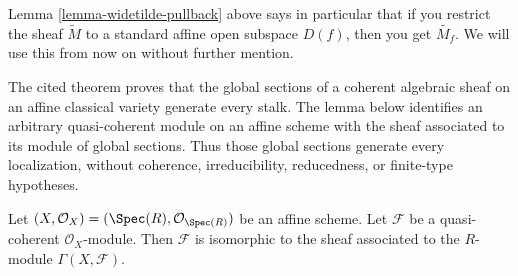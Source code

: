 \noindent
Lemma \ref{lemma-widetilde-pullback} above says in particular
that if you restrict
the sheaf $\widetilde M$ to a standard affine open subspace
$D(f)$, then you get $\widetilde{M_f}$. We will use this from
now on without further mention.

\begin{lemma}
\label{lemma-quasi-coherent-affine}
\begin{reference}
\cite[Chapter II, \S 3, no. 45, Theorem 2, pp. 237--238]{FAC}
\end{reference}
\begin{history}
The cited theorem proves that the global sections of a coherent algebraic
sheaf on an affine classical variety generate every stalk. The lemma below
identifies an arbitrary quasi-coherent module on an affine scheme with the
sheaf associated to its module of global sections. Thus those global sections
generate every localization, without coherence, irreducibility, reducedness,
or finite-type hypotheses.
\end{history}
Let $(X, \mathcal{O}_X) = (\Spec(R), \mathcal{O}_{\Spec(R)})$
be an affine scheme. Let $\mathcal{F}$ be a
quasi-coherent $\mathcal{O}_X$-module. Then
$\mathcal{F}$ is isomorphic to the sheaf associated to
the $R$-module $\Gamma(X, \mathcal{F})$.
\end{lemma}

